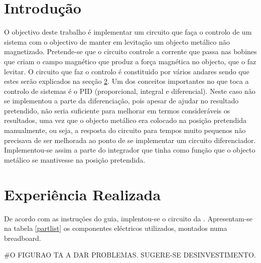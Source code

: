 \documentclass[%
  reprint,
  nofootinbib,
  amsmath,amssymb,
  aps,
  10pt,
  a4paper
]{revtex4-1}
\begin{document}
\section{Introdução}
\label{s:intro}

O objectivo deste trabalho é implementar um circuito que faça o controlo de um sistema com o objectivo de manter em levitação um objecto metálico não magnetizado. Pretende-se que o circuito controle a corrente que passa nas bobines que criam o campo magnético que produz a força magnética no objecto, que o faz levitar. O circuito que faz o controlo é constituido por vários andares sendo que estes serão explicados na secção \ref{s:expreal}. Um dos conceitos importantes no que toca a controlo de sistemas é o PID (proporcional, integral e diferencial). Neste caso não se implementou a parte da diferenciação, pois apesar de ajudar no resultado pretendido, não seria suficiente para melhorar em termos consideráveis os resultados, uma vez que o objecto metálico era colocado na posição pretendida manualmente, ou seja, a resposta do circuito para tempos muito pequenos não precisava de ser melhorada ao ponto de se implementar um circuito diferenciador. Implementou-se assim a parte do integrador que tinha como função que o objecto metálico se mantivesse na posição pretendida.


\section{Experiência Realizada}
\label{s:expreal}
De acordo com as instruções do guia, implentou-se o circuito da . Apresentam-se na tabela \ref{partlist} os componentes eléctricos utilizados, montados numa breadboard.

#O FIGURAO TA A DAR PROBLEMAS. SUGERE-SE DESINVESTIMENTO.
\end{document}
